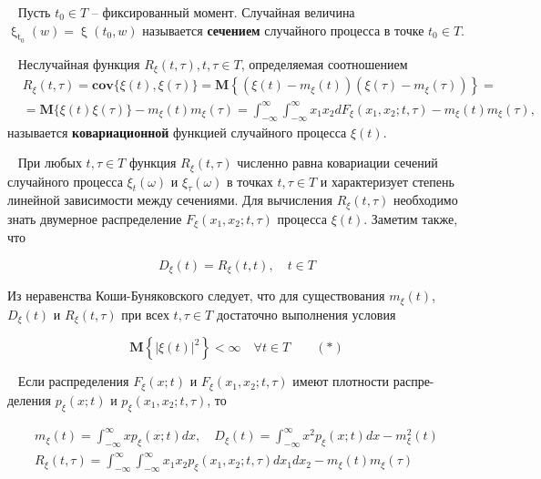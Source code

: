  \begin{definition}~\cite{MillerRPET2001} Пусть $t_0 \in T$ -- фиксированный момент. Случайная величина $\upxi_{\text{t}_0}(w) = \upxi(t_0, w)$ называется \textbf{сечением} случайного процесса в точке $t_0 \in T$.
\end{definition}

 \begin{definition}~\cite{MillerRPET2001} Неслучайная функция $R_{\xi}(t, \tau), t, \tau \in T$, определяемая соотношением
$$
\begin{aligned}
& R_{\xi}(t, \tau)=\mathbf{c o v}\{\xi(t), \xi(\tau)\}=\mathbf{M}\left\{\left(\xi(t)-m_{\xi}(t)\right)\left(\xi(\tau)-m_{\xi}(\tau)\right)\right\}= \\
& =\mathbf{M}\{\xi(t) \xi(\tau)\}-m_{\xi}(t) m_{\xi}(\tau)=\int_{-\infty}^{\infty} \int_{-\infty}^{\infty} x_{1} x_{2} d F_{\xi}\left(x_{1}, x_{2} ; t, \tau\right)-m_{\xi}(t) m_{\xi}(\tau),
\end{aligned}
$$
называется \textbf{ковариационной} функцией случайного процесса $\xi(t)$.
\end{definition}

 \begin{remark}~\cite{MillerRPET2001} При любых $t, \tau \in T$ функция $R_{\xi}(t, \tau)$ численно равна ковариации сечений случайного процесса $\xi_{t}(\omega)$ и $\xi_{\tau}(\omega)$ в точках $t, \tau \in T$ и характеризует степень линейной зависимости между сечениями. Для вычисления $R_{\xi}(t, \tau)$ необходимо знать двумерное распределение $F_{\xi}\left(x_{1}, x_{2} ; t, \tau\right)$ процесса $\xi(t)$. Заметим также, что

$$
D_{\xi}(t)=R_{\xi}(t, t), \quad t \in T
$$

Из неравенства Коши-Буняковского следует, что для существования $m_{\xi}(t)$, $D_{\xi}(t)$ и $R_{\xi}(t, \tau)$ при всех $t, \tau \in T$ достаточно выполнения условия

$$
\mathbf{M}\left\{|\xi(t)|^{2}\right\}<\infty \quad \forall t \in T \quad \quad (*)
$$
\end{remark}

 \begin{remark}~\cite{MillerRPET2001} Если распределения $F_{\xi}(x ; t)$ и $F_{\xi}\left(x_{1}, x_{2} ; t, \tau\right)$ имеют плотности распре- деления $p_{\xi}(x ; t)$ и $p_{\xi}\left(x_{1}, x_{2} ; t, \tau\right)$, то

$$
\begin{gathered}
m_{\xi}(t)=\int_{-\infty}^{\infty} x p_{\xi}(x ; t) d x, \quad D_{\xi}(t)=\int_{-\infty}^{\infty} x^{2} p_{\xi}(x ; t) d x-m_{\xi}^{2}(t) \\
R_{\xi}(t, \tau)=\int_{-\infty}^{\infty} \int_{-\infty}^{\infty} x_{1} x_{2} p_{\xi}\left(x_{1}, x_{2} ; t, \tau\right) d x_{1} d x_{2}-m_{\xi}(t) m_{\xi}(\tau)
\end{gathered}
$$
\end{remark}

